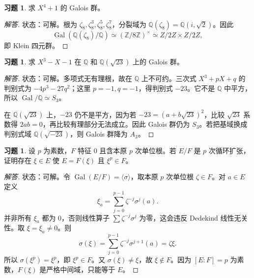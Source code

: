 \documentclass[11pt,a4paper,openany]{ctexbook}
\numberwithin{equation}{chapter}
\newcommand{\Q}{\mathbb{Q}}
\newcommand{\Z}{\mathbb{Z}}
\newcommand{\Gal}{\operatorname{Gal}}
\theoremstyle{plain}
\theoremstyle{definition}
\newtheorem{exercise}[theorem]{习题}
\theoremstyle{remark}
\begin{document}
\begin{exercise}
求 $X^4+1$ 的 Galois 群。
\end{exercise}
\begin{proof}[解答]
状态：可解。根为 $\zeta_8,\zeta_8^3,\zeta_8^5,\zeta_8^7$，分裂域为 $\Q(\zeta_8)=\Q(i,\sqrt2)$。因此
\[
\Gal(\Q(\zeta_8)/\Q)\simeq(\Z/8\Z)^\times\simeq Z/2Z\times Z/2Z,
\]
即 Klein 四元群。
\end{proof}

\begin{exercise}
求 $X^3-X-1$ 在 $\Q$ 和 $\Q(\sqrt{23})$ 上的 Galois 群。
\end{exercise}
\begin{proof}[解答]
状态：可解。多项式无有理根，故在 $\Q$ 上不可约。三次式 $X^3+pX+q$ 的判别式为 $-4p^3-27q^2$；这里 $p=-1,q=-1$，得判别式 $-23$。它不是 $\Q$ 中平方，所以 $\Gal/\Q\simeq S_3$。

在 $\Q(\sqrt{23})$ 上，$-23$ 仍不是平方，因为若 $-23=(a+b\sqrt{23})^2$，比较 $\sqrt{23}$ 系数得 $2ab=0$，再比较有理部分无法成立。因此 Galois 群仍为 $S_3$。若把基域换成判别式域 $\Q(\sqrt{-23})$，则 Galois 群降为 $A_3$。
\end{proof}

\begin{exercise}
设 $p$ 为素数，$F$ 特征 $0$ 且含本原 $p$ 次单位根。若 $E/F$ 是 $p$ 次循环扩张，证明存在 $\xi\in E$ 使 $E=F(\xi)$ 且 $\xi^p\in F$。
\end{exercise}
\begin{proof}[解答]
状态：可解。令 $\Gal(E/F)=\langle\sigma\rangle$，取本原 $p$ 次单位根 $\zeta\in F$。对 $a\in E$ 定义
\[
\xi_a=\sum_{j=0}^{p-1}\zeta^{-j}\sigma^j(a).
\]
并非所有 $\xi_a$ 都为 $0$，否则线性算子 $\sum\zeta^{-j}\sigma^j$ 为零，这会违反 Dedekind 线性无关性。取 $\xi=\xi_a\ne0$。则
\[
\sigma(\xi)=\sum_{j=0}^{p-1}\zeta^{-j}\sigma^{j+1}(a)=\zeta\xi.
\]
所以 $\sigma(\xi^p)=\xi^p$，即 $\xi^p\in F$。又 $\sigma(\xi)\ne\xi$，故 $\xi\notin F$。因为 $[E:F]=p$ 为素数，$F(\xi)$ 是严格中间域，只能等于 $E$。
\end{proof}
\end{document}
